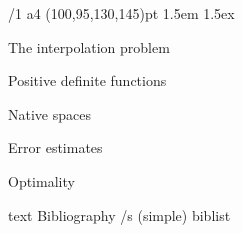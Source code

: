 \useOpTeX  %



\hyperlinks \Black \Black
{}

\enlang
\fontfam[EBGaramond]

\margins/1 a4 (100,95,130,145)pt
\typosize[12.21/14.43]
\parindent 1.5em
\parskip 1.5ex

\tocpage


\sec The interpolation problem


\sec Positive definite functions


\sec Native spaces


\sec Error estimates


\sec Optimality










\let\_mtext\ignoreit
\nonum\chap Bibliography
\def\_opwarning#1{}
\usebib/s (simple) biblist


\bye